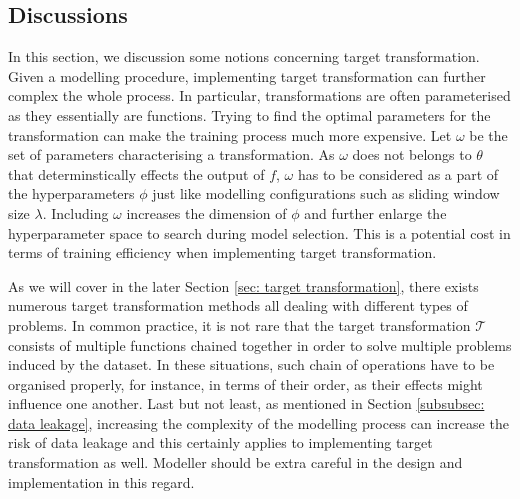 \subsection{Discussions}
In this section, we discussion some notions concerning target transformation. Given a modelling procedure, implementing target transformation can further complex the whole process. In particular, transformations are often parameterised as they essentially are functions. Trying to find the optimal parameters for the transformation can make the training process much more expensive. Let $\omega$ be the set of parameters characterising a transformation. As $\omega$ does not belongs to $\theta$ that determinstically effects the output of $f$, $\omega$ has to be considered as a part of the hyperparameters $\phi$ just like modelling configurations such as sliding window size $\lambda$. Including $\omega$ increases the dimension of $\phi$ and further enlarge the hyperparameter space to search during model selection. This is a potential cost in terms of training efficiency when implementing target transformation.

As we will cover in the later Section \ref{sec: target transformation}, there exists numerous target transformation methods all dealing with different types of problems. In common practice, it is not rare that the target transformation $\mathcal{T}$ consists of multiple functions chained together in order to solve multiple problems induced by the dataset. In these situations, such chain of operations have to be organised properly, for instance, in terms of their order, as their effects might influence one another. Last but not least, as mentioned in Section \ref{subsubsec: data leakage}, increasing the complexity of the modelling process can increase the risk of data leakage and this certainly applies to implementing target transformation as well. Modeller should be extra careful in the design and implementation in this regard.
